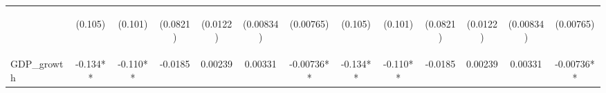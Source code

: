 \documentclass[]{article}
\begin{document}
\begin{center}
\begin{tabular}{lcccccccccccc}
\vspace{4pt} & \begin{footnotesize}(0.105)\end{footnotesize} & \begin{footnotesize}(0.101)\end{footnotesize} & \begin{footnotesize}(0.0821)\end{footnotesize} & \begin{footnotesize}(0.0122)\end{footnotesize} & \begin{footnotesize}(0.00834)\end{footnotesize} & \begin{footnotesize}(0.00765)\end{footnotesize} & \begin{footnotesize}(0.105)\end{footnotesize} & \begin{footnotesize}(0.101)\end{footnotesize} & \begin{footnotesize}(0.0821)\end{footnotesize} & \begin{footnotesize}(0.0122)\end{footnotesize} & \begin{footnotesize}(0.00834)\end{footnotesize} & \begin{footnotesize}(0.00765)\end{footnotesize} \\
GDP\_growth & -0.134** & -0.110** & -0.0185 & 0.00239 & 0.00331 & -0.00736** & -0.134** & -0.110** & -0.0185 & 0.00239 & 0.00331 & -0.00736** \\

\end{tabular}
\end{center}
\end{document}
